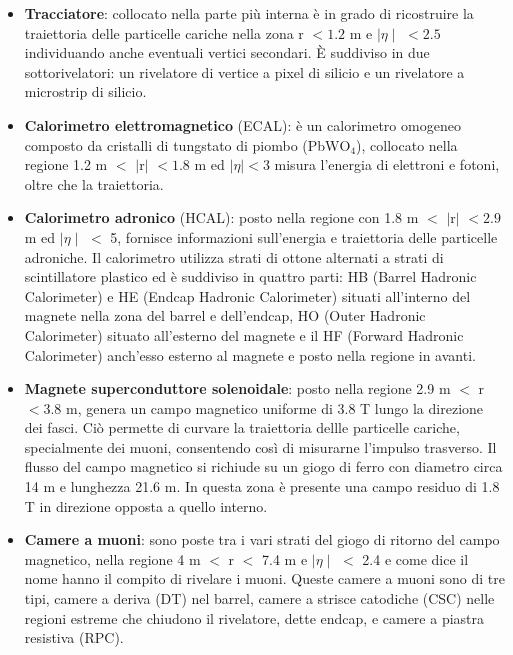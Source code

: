 \begin{itemize}
\item \textbf{Tracciatore}: collocato nella parte più interna è in grado di ricostruire la traiettoria delle particelle cariche  nella zona r $< 1.2$ m e $\mid\eta\mid$ $< 2.5$ individuando anche
eventuali vertici secondari. È suddiviso in due sottorivelatori: un rivelatore di vertice a pixel di silicio e un rivelatore a microstrip di silicio.

\item \textbf{Calorimetro elettromagnetico} (ECAL): è un calorimetro omogeneo composto da cristalli di tungstato di piombo (PbW$\mathrm{O_4}$), collocato nella regione 1.2 m $<$ $\mid$r$\mid$ $< 1.8$ m ed $\mid\eta\mid < 3$ misura l'energia di elettroni e fotoni, oltre che la traiettoria.

\item \textbf{Calorimetro adronico} (HCAL): posto nella regione con 1.8 m $<$ $\mid$r$\mid$ $< 2.9$ m ed $\mid\eta\mid$ $<$ 5, fornisce informazioni sull’energia e traiettoria delle particelle
adroniche. Il calorimetro utilizza strati di ottone alternati a strati di scintillatore plastico ed è suddiviso in quattro parti: HB (Barrel Hadronic Calorimeter) e HE (Endcap Hadronic Calorimeter) situati all’interno del magnete nella zona del barrel e dell’endcap, HO (Outer Hadronic Calorimeter) situato all'esterno del magnete e il HF (Forward Hadronic Calorimeter) anch'esso esterno al magnete e posto nella regione in avanti.

\item \textbf{Magnete superconduttore solenoidale}: posto nella regione 2.9 m $<$ r $< 3.8$ m, genera un campo magnetico uniforme di 3.8 T lungo la direzione dei fasci. Ciò permette di curvare la traiettoria dellle particelle cariche, specialmente dei muoni, consentendo così di misurarne l'impulso trasverso. Il flusso del campo magnetico si richiude su un giogo di
ferro con diametro circa 14 m e lunghezza 21.6 m. In questa zona è presente una campo residuo di 1.8 T in direzione opposta a quello interno.

\item \textbf{Camere a muoni}: sono poste tra i vari strati del giogo di ritorno del campo magnetico, nella regione 4 m $<$ r $<$ 7.4 m e $\mid\eta\mid$ $<$ 2.4 e come dice il nome hanno il compito di rivelare i muoni. Queste camere a muoni sono di tre tipi, camere a deriva (DT) nel barrel, camere a strisce catodiche (CSC) nelle regioni estreme che chiudono il rivelatore, dette endcap, e camere a piastra resistiva (RPC).

\end{itemize}
